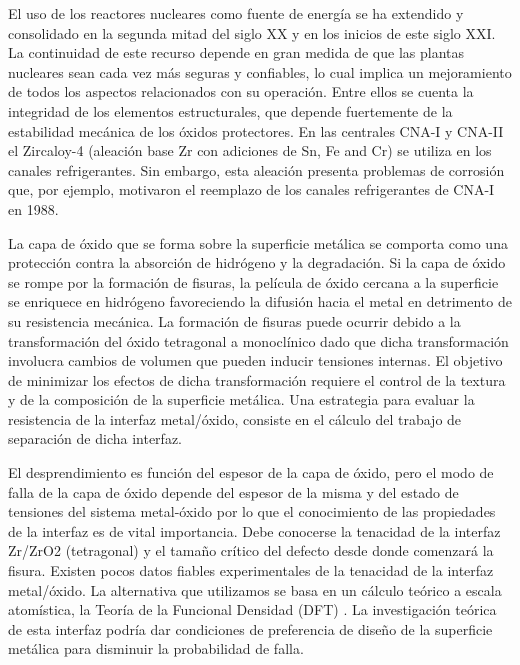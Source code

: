 El uso de los reactores nucleares como fuente de energía se ha extendido y 
consolidado en la segunda mitad del siglo XX y en los inicios de este siglo 
XXI. La continuidad de este recurso depende en gran medida de que las plantas 
nucleares sean cada vez más seguras y confiables, lo cual implica un 
mejoramiento de todos los aspectos relacionados con su operación. Entre ellos 
se cuenta la integridad de los elementos estructurales, que depende fuertemente 
de la estabilidad mecánica de los óxidos protectores. En las centrales CNA-I y 
CNA-II el Zircaloy-4 (aleación base Zr con adiciones de Sn, Fe and Cr) se 
utiliza en los canales refrigerantes\cite{Estevez2000}. Sin embargo, esta 
aleación presenta 
problemas de corrosión que, por ejemplo, motivaron el reemplazo de los canales 
refrigerantes de CNA-I en 1988.

La capa de óxido que se forma sobre la superficie metálica se comporta como una 
protección contra la absorción de hidrógeno y la degradación. Si la capa de 
óxido se rompe por la formación de fisuras, la película de óxido cercana a la 
superficie se enriquece en hidrógeno favoreciendo la difusión hacia el metal en 
detrimento de su resistencia mecánica. La formación de fisuras puede ocurrir 
debido a la transformación del óxido tetragonal a monoclínico dado que dicha 
transformación involucra cambios de volumen que pueden inducir tensiones 
internas. El objetivo de minimizar los efectos de dicha transformación requiere 
el control de la textura y de la composición de la superficie metálica. Una 
estrategia para evaluar la resistencia de la interfaz metal/óxido, consiste en 
el cálculo del trabajo de separación de dicha interfaz.

El desprendimiento es función del espesor de la capa de óxido\cite{Schutze2005},
pero el modo 
de falla de la capa de óxido depende del espesor de la misma y del estado de 
tensiones del sistema metal-óxido por lo que el conocimiento de las propiedades 
de la interfaz es de vital importancia. Debe conocerse la tenacidad de la 
interfaz Zr/ZrO2 (tetragonal) y el tamaño crítico del defecto desde donde 
comenzará la fisura. Existen pocos datos fiables experimentales de la tenacidad 
de la interfaz metal/óxido. La alternativa que utilizamos se basa en un cálculo 
teórico a escala atomística, la Teoría de la Funcional Densidad (DFT) 
\cite{KohnSham65,HohenbergKohn64}. La 
investigación teórica de esta interfaz podría dar condiciones de preferencia de 
diseño de la superficie metálica para disminuir la probabilidad de falla.

